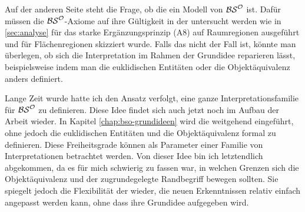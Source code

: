     Auf
    der anderen Seite steht die Frage, ob die \strukt ein Modell von $\mathcal{BS}^{\mathcal{O}}$ ist. Dafür müssen die $\mathcal{BS}^{\mathcal{O}}$-Axiome auf ihre Gültigkeit in der \strukt untersucht werden wie in \ref{sec:analyse} für das starke Ergänzungsprinzip (A8) auf Raumregionen ausgeführt und für Flächenregionen skizziert wurde.
    Falls das nicht der Fall ist, könnte man überlegen, ob sich die Interpretation im Rahmen der Grundidee reparieren lässt, beispielsweise indem man die euklidischen Entitäten oder die Objektäquivalenz anders definiert.
    
    Lange Zeit
    wurde hatte ich den Ansatz verfolgt, eine ganze Interpretationsfamilie für $\mathcal{BS}^{\mathcal{O}}$ zu definieren.
    Diese Idee findet sich auch jetzt noch im Aufbau der Arbeit wieder.
    In Kapitel \ref{chap:bso-grundideen} wird die \strukt weitgehend eingeführt, ohne jedoch die euklidischen Entitäten und die Objektäquivalenz formal zu definieren.
    Diese Freiheitsgrade können als Parameter einer Familie von Interpretationen betrachtet werden.
    Von dieser Idee bin ich letztendlich abgekommen, da es für mich schwierig zu fassen war, in welchen Grenzen sich die Objektäquivalenz und der zugrundegelegte Randbegriff bewegen sollten.
    Sie spiegelt jedoch die Flexibilität der \strukt wieder, die neuen Erkenntnissen relativ einfach angepasst werden kann, ohne dass ihre Grundidee aufgegeben wird.

